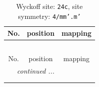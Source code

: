 \documentclass[fleqn,8pt]{jsarticle}
\begin{document}
\renewcommand{\arraystretch}{1.2}
\begin{longtable}{ccc}
\caption{Wyckoff site: {\tt 24c}, site symmetry: {\tt 4/mm'.m'}}
 \\
 \hline \hline
No. & position & mapping \\ \hline \endfirsthead

\multicolumn{2}{l}{\tablename\ \thetable{}} \\
 \hline \hline
No. & position & mapping \\ \hline \endhead

 \hline \hline
\multicolumn{2}{r}{\footnotesize\it continued ...} \\ \endfoot

 \hline \hline
\multicolumn{2}{r}{} \\ \endlastfoot


\end{longtable}
\end{document}
